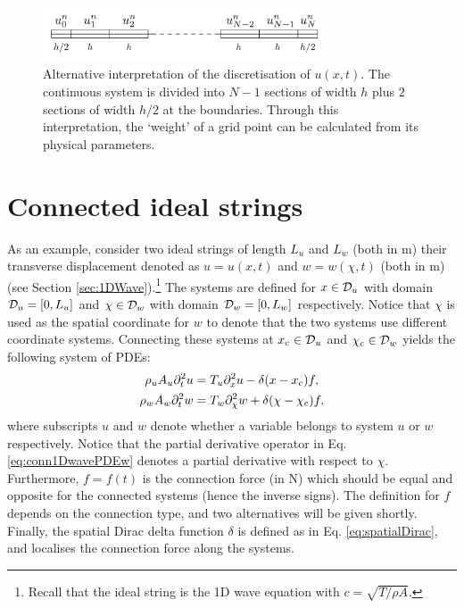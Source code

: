 \begin{figure}[h]
    \centering
    \includegraphics[width=0.75\textwidth]{figures/fdtd/gridFigure2.pdf}
    \caption{Alternative interpretation of the discretisation of $u(x,t)$. The continuous system is divided into $N-1$ sections of width $h$ plus $2$ sections of width $h/2$ at the boundaries. Through this interpretation, the `weight' of a grid point can be calculated from its physical parameters. \label{fig:gridExp2}}
\end{figure}

\section{Connected ideal strings}
As an example, consider two ideal strings of length $L_u$ and $L_w$ (both in m) their transverse displacement denoted as $u=u(x,t)$ and $w = w(\chi,t)$ (both in m) (see Section \ref{sec:1DWave}).\footnote{Recall that the ideal string is the 1D wave equation with $c=\sqrt{T/\rho A}$.}  The systems are defined for $x\in \mathcal{D}_u$ with domain $\mathcal{D}_u=[0,L_u]$ and $\chi \in \mathcal{D}_w$ with domain $\mathcal{D}_w=[0,L_w]$ respectively. Notice that $\chi$ is used as the spatial coordinate for $w$ to denote that the two systems use different coordinate systems. Connecting these systems at $x_{\text{c}}\in \mathcal{D}_u$ and $\chi_{\text{c}}\in\mathcal{D}_w$ yields the following system of PDEs:
\begin{subequations}\label{eq:conn1DwavePDE}
    \begin{align}
        \rho_u A_u \partial_t^2 u &= T_u \partial_x^2 u -\delta(x-x_{\text{c}})f, \label{eq:conn1DwavePDEu} \\
        \rho_w A_w \partial_t^2 w &= T_w \partial_\chi^2 w + \delta(\chi-\chi_{\text{c}})f,\label{eq:conn1DwavePDEw}
    \end{align}
\end{subequations}
where subscripts $u$ and $w$ denote whether a variable belongs to system $u$ or $w$ respectively. Notice that the partial derivative operator in Eq. \eqref{eq:conn1DwavePDEw} denotes a partial derivative with respect to $\chi$. Furthermore, $f = f(t)$ is the connection force (in N) which should be equal and opposite for the connected systems (hence the inverse signs). The definition for $f$ depends on the connection type, and two alternatives will be given shortly. Finally, the spatial Dirac delta function $\delta$ is defined as in Eq. \eqref{eq:spatialDirac}, and localises the connection force along the systems.

